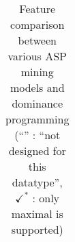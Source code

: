 \begin{table}[t]
\begin{tabular}{@{}lccccc@{}}
  \end{tabular} 
 \caption{Feature comparison between various ASP mining models and dominance programming (``\na'' : ``not designed for this datatype'', $\checkmark^*$ : only maximal is supported)}
  \label{tab:comparison}
\end{table}



